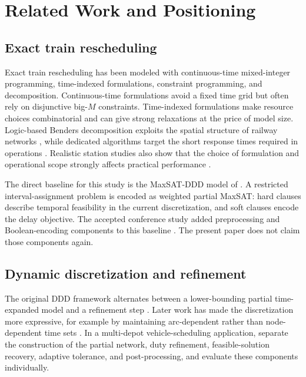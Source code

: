 \documentclass[preprint,12pt,authoryear]{elsarticle}
\begin{document}
\section{Related Work and Positioning}
\label{sec:related}

\subsection{Exact train rescheduling}

Exact train rescheduling has been modeled with continuous-time mixed-integer
programming, time-indexed formulations, constraint programming, and
decomposition. Continuous-time formulations avoid a fixed time grid but often
rely on disjunctive big-$M$ constraints. Time-indexed formulations make resource
choices combinatorial and can give strong relaxations at the price of model
size. Logic-based Benders decomposition exploits the spatial structure of
railway networks \citep{LamorgeseMannino2015,LeutwilerCorman2022}, while
dedicated algorithms target the short response times required in operations
\citep{Sama2017,Bettinelli2017}. Realistic station studies also show that the
choice of formulation and operational scope strongly affects practical
performance \citep{ManninoNakkerud2023}.

The direct baseline for this study is the MaxSAT-DDD model of
\citet{Croella2024}. A restricted interval-assignment problem is encoded as
weighted partial MaxSAT: hard clauses describe temporal feasibility in the
current discretization, and soft clauses encode the delay objective. The
accepted conference study added preprocessing and Boolean-encoding components
to this baseline \citep{KieuEtAl2026Conference}. The present paper does not
claim those components again.

\subsection{Dynamic discretization and refinement}

The original DDD framework alternates between a lower-bounding partial
time-expanded model and a refinement step \citep{Boland2017}. Later work has
made the discretization more expressive, for example by maintaining
arc-dependent rather than node-dependent time sets
\citep{VanDykKoenemann2024}. In a multi-depot vehicle-scheduling application,
\citet{VanLieshoutVanderSchaft2025} separate the construction of the partial
network, duty refinement, feasible-solution recovery, adaptive tolerance, and
post-processing, and evaluate these components individually.
\end{document}
